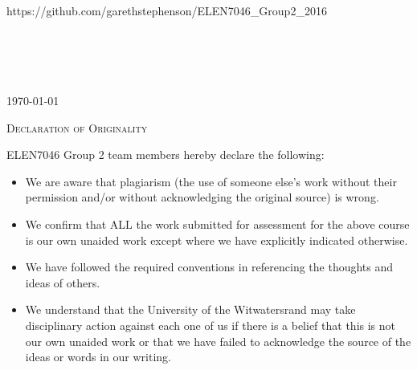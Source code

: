 \documentclass[12pt]{article} %
\begin{document}
\begin{titlepage}
		https://github.com/garethstephenson/ELEN7046\_Group2\_2016\\
		\
		\\
		\
		\\
		\
		\\
		\
	
		{\large \today}\\[3cm] %
		
		
		\vfill %
		
	\end{titlepage}
	
		\newpage
		\begin{flushleft}\large
			\textsc{Declaration of Originality}\\
		\end{flushleft}
		
		ELEN7046 Group 2 team members hereby declare the following:
		
		\begin{itemize}
			\item We are aware that plagiarism (the use of someone else’s work without their permission and/or without acknowledging the original source) is wrong.
			\item We confirm that ALL the work submitted for assessment for the above course is our own unaided work except where we have explicitly indicated otherwise.
			\item We have followed the required conventions in referencing the thoughts and ideas of others.
			\item We understand that the University of the Witwatersrand may take disciplinary action against each one of us if there is a belief that this is not our own unaided work or that we have failed to acknowledge the source of the ideas or words in our writing.
		\end{itemize}
		
\end{document}
